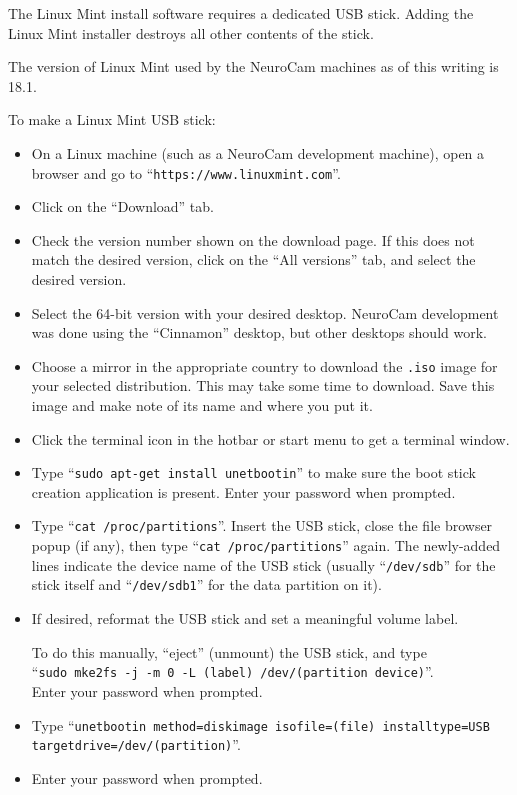 The Linux Mint install software requires a dedicated USB stick. Adding the
Linux Mint installer destroys all other contents of the stick.

The version of Linux Mint used by the NeuroCam machines as of this writing
is 18.1.

To make a Linux Mint USB stick:
\begin{itemize}
\item On a Linux machine (such as a NeuroCam development machine), open
a browser and go to ``\verb+https://www.linuxmint.com+''.
\item Click on the ``Download'' tab.
\item Check the version number shown on the download page. If this does not
match the desired version, click on the ``All versions'' tab, and select the
desired version.
\item Select the 64-bit version with your desired desktop. NeuroCam
development was done using the ``Cinnamon'' desktop, but other desktops
should work.
\item Choose a mirror in the appropriate country to download the \verb+.iso+
image for your selected distribution. This may take some time to download.
Save this image and make note of its name and where you put it.
\item Click the terminal icon in the hotbar or start menu to get a terminal
window.
\item Type ``\verb+sudo apt-get install unetbootin+'' to make sure the
boot stick creation application is present. Enter your password when
prompted.
\item Type ``\verb+cat /proc/partitions+''. Insert the USB stick, close the
file browser popup (if any), then type ``\verb+cat /proc/partitions+'' again.
The newly-added lines indicate the device name of the USB stick (usually
``\verb+/dev/sdb+'' for the stick itself and ``\verb+/dev/sdb1+'' for the
data partition on it).
\item If desired, reformat the USB stick and set a meaningful volume label.
\par
To do this manually, ``eject'' (unmount) the USB stick, and type \\
``\verb+sudo mke2fs -j -m 0 -L (label) /dev/(partition device)+''. \\
Enter your password when prompted.
\item Type
``\verb+unetbootin method=diskimage isofile=(file) installtype=USB+ \\
\verb+targetdrive=/dev/(partition)+''.
\item Enter your password when prompted.

\end{itemize}
